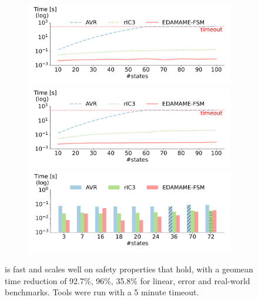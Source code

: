 \documentclass[acmsmall,screen,review]{acmart}
\begin{document}
\begin{figure}[t]
  \centering
  \begin{subfigure}{\columnwidth}
  \includegraphics[width=\columnwidth]{fsm-plots/safety-sat_linear.pdf}
  \label{fig:benchmark-lin-s}
  \includegraphics[width=\columnwidth]{fsm-plots/safety-sat_err.pdf}
  \label{fig:benchmark-err-s}
  \includegraphics[width=\columnwidth]{fsm-plots/safety-sat_rw.pdf}
  \label{fig:benchmark-rw-s}
  \end{subfigure}
  \caption[]{\toolname{} is fast and scales well on safety properties that hold, 
    with a geomean time reduction of 92.7\%, 96\%, 35.8\% for linear, error and real-world benchmarks. Tools were run with a 5 minute timeout.}\label{fig:safety-results-sat}
\end{figure}
\end{document}
